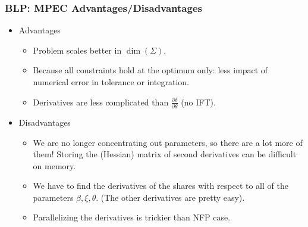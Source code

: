 \documentclass[xcolor=pdftex,dvipsnames,table,mathserif,aspectratio=169]{beamer}
\begin{document}
\begin{frame}
\frametitle{BLP: MPEC Advantages/Disadvantages}
\begin{itemize}
\item Advantages
\begin{itemize}
\item Problem scales better in $\dim(\Sigma)$.
\item Because all constraints hold at the optimum only: less impact of numerical error in tolerance or integration.
\item Derivatives are less complicated than $\frac{\partial \delta}{\partial \theta}$ (no IFT).
\end{itemize}
\item Disadvantages
\begin{itemize}
\item We are no longer concentrating out parameters, so there are a lot more of them! Storing the (Hessian) matrix of second derivatives can be difficult on memory.
\item We have to find the derivatives of the shares with respect to all of the parameters $\beta,\xi,\theta$. (The other derivatives are pretty easy).
\item Parallelizing the derivatives is trickier than NFP case.
\end{itemize}
\end{itemize}
\end{frame}


%
%



%
\end{document}
